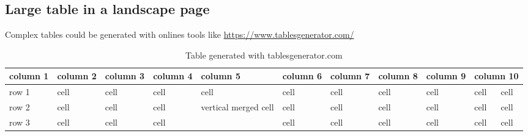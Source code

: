 \documentclass[Theme1]{{template_material/eurostat}}
\begin{document}
\begin{landscape}
\subsection{Large table in a landscape page}
Complex tables could be generated with onlines tools like \url{https://www.tablesgenerator.com/}

\begin{table}[h]
 \caption{Table generated with tablesgenerator.com}
 \label{table:C}
 
    \begin{tabular}{l|l|l|l|l|l|l|l|l|l|l}
    \hline
    column 1 & column 2 & column 3 & column 4 & column 5                              & column 6 & column 7 & column 8 & column 9 & \multicolumn{2}{l}{column 10} \\ \hline
    \rowcolor{TH20p} 
    row 1    & cell     & cell     & cell     & cell                                  & cell     & cell     & cell     & cell     & cell           & cell          \\ \hline
    row 2    & cell     & cell     & cell     & \multirow{2}{*}{vertical merged cell} & cell     & cell     & cell     & cell     & cell           & cell          \\ \cline{1-4} \cline{6-11} 
    row 3    & cell     & cell     & cell     &                                       & cell     & cell     & cell     & cell     & cell           & cell          \\ \hline
    \end{tabular}
\end{table}




\begin{table}[h]


\end{table}
\end{landscape}
\end{document}
